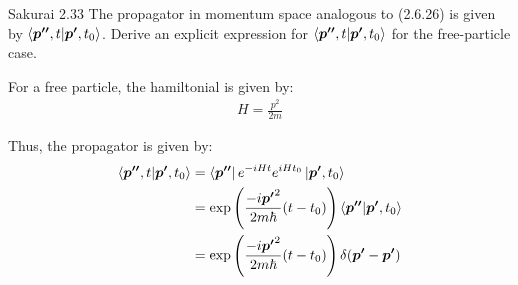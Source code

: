 \documentclass{article}
\newcommand{\bs}{\boldsymbol}
\begin{document}
\newpage
\begin{section}{Sakurai 2.33}
The propagator in momentum space analogous to (2.6.26) is given by $\bra{\bs{p''},t}\ket{\bs{p'},t_0}$. Derive an explicit expression for $\bra{\bs{p''},t}\ket{\bs{p'},t_0}$ for the free-particle case.

\begin{tcolorbox}[breakable]
	For a free particle, the hamiltonial is given by:
	\begin{align*}
		H = \frac{p^2}{2m}
	\end{align*}

	Thus, the propagator is given by:
	\begin{align*}
		\bra{\bs{p''},t}\ket{\bs{p'},t_0}
		 & = \bra{\bs{p''}} e^{-iHt} e^{iHt_0} \ket{\bs{p'},t_0}                                     \\
		 & = \exp\left( \frac{-i\bs{p'}^2}{2m\hbar} (t-t_0) \right) \bra{\bs{p''}} \ket{\bs{p'},t_0} \\
		 & = \exp\left( \frac{-i\bs{p'}^2}{2m\hbar} (t-t_0) \right) \delta(\bs{p'}-\bs{p'})          \\
	\end{align*}
\end{tcolorbox}
\end{section}
\end{document}
